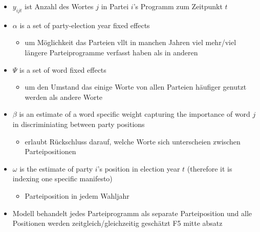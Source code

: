 \documentclass[11pt]{article}
\begin{document}
\begin{itemize}
\item \(y_{ijt}\) ist  Anzahl des Wortes \(j\) in Partei \(i\)'s Programm zum Zeitpunkt \(t\)
\item \(\alpha\) is a set of party-election year fixed effects
\begin{itemize}
\item um Möglichkeit das Parteien vllt in manchen Jahren viel mehr/viel längere Parteiprogramme verfasst haben als in anderen
\end{itemize}
\item \(\Psi\) is a set of word fixed effects
\begin{itemize}
\item um den Umstand das einige Worte von allen Parteien häufiger genutzt werden als andere Worte
\end{itemize}
\item \(\beta\) is an estimate of a word specific weight capturing the importance of word \(j\) in discriminiating between party positions
\begin{itemize}
\item erlaubt Rückschluss darauf, welche Worte sich unterscheien zwischen Parteipositionen
\end{itemize}
\item \(\omega\) is the estimate of party \(i\)'s position in election year \(t\) (therefore it is indexing one specific manifesto)
\begin{itemize}
\item Parteiposition in jedem Wahljahr
\end{itemize}

\item Modell behandelt jedes Parteiprogramm als separate Parteiposition und alle Positionen werden zeitgleich/gleichzeitig geschätzt
F5 mitte absatz
\end{itemize}
\end{document}
